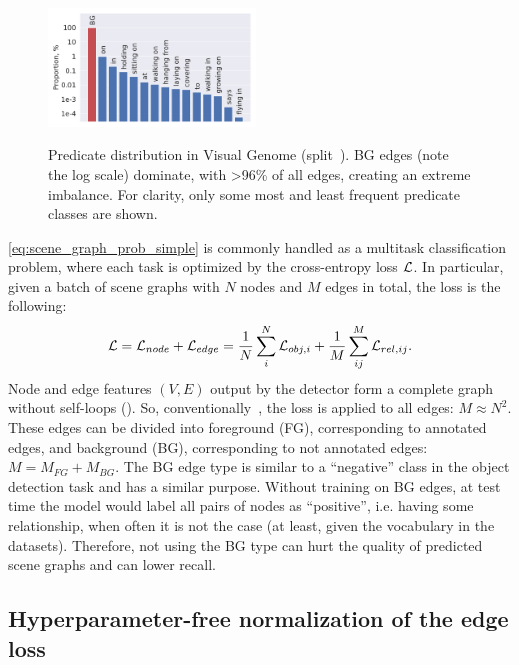 \begin{figure}%
	\vspace{-10pt}
	\centering
	\includegraphics[width=5.5cm,align=c]{rel_distr_train_VG.pdf} \\
	\vspace{-5pt}
	\caption{\small Predicate distribution in Visual Genome (split~\citep{xu2017scene}). BG edges (note the log scale) dominate, with >96\% of all edges, creating an extreme imbalance. For clarity, only some most and least frequent predicate classes are shown.}
	\label{fig:pred_distr}
\end{figure}

\eqref{eq:scene_graph_prob_simple} is commonly handled as a multitask classification problem, where each task is optimized by the cross-entropy loss ${\cal L}$.
In particular, given a batch of scene graphs with $N$ nodes and $M$ edges in total, the loss is the following:
\begin{equation}
\label{eq:loss_baseline}
{\cal L} = {\cal L}_{node} + {\cal L}_{edge} = \frac{1}{N}\sum_i^N{\cal L}_{obj,i} + \frac{1}{M}\sum_{ij}^M {\cal L}_{rel,ij}.
\end{equation}
Node and edge features $(V,E)$ output by the detector form a complete graph without self-loops (\fig{\ref{fig:overview}}). So, conventionally~\citep{xu2017scene,yang2018graph,zellers2018neural}, the loss is applied to all edges: $M \approx N^2$.
These edges can be divided into foreground (FG), corresponding to annotated edges, and background (BG), corresponding to not annotated edges: $M = M_{FG} + M_{BG}$.
The BG edge type is similar to a ``negative'' class in the object detection task and has a similar purpose.
Without training on BG edges, at test time the model would label all pairs of nodes as ``positive'', i.e. having some relationship, when often it is not the case (at least, given the vocabulary in the datasets). Therefore, not using the BG type can hurt the quality of predicted scene graphs and can lower recall.

\subsection{Hyperparameter-free normalization of the edge loss}
\label{sec:loss_norm}


